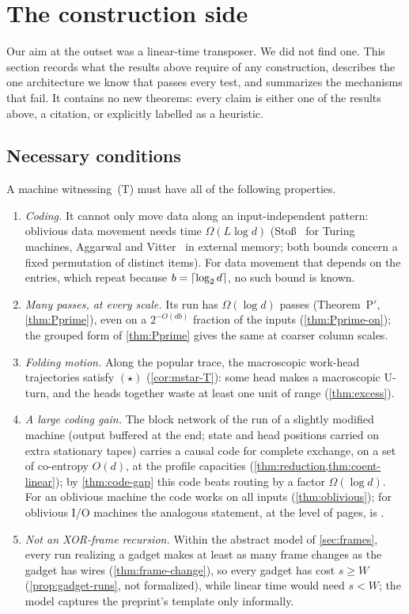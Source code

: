 \section{The construction side}\label{sec:construction}

Our aim at the outset was a linear-time transposer. We did not find one. This section records what the
results above require of any construction, describes the one architecture we know that passes every
test, and summarizes the mechanisms that fail. It contains no new theorems: every claim is either one of
the results above, a citation, or explicitly labelled as a heuristic.

\subsection{Necessary conditions}

A machine witnessing~(T) must have all of the following properties.
\begin{enumerate}[label=(N\arabic*),leftmargin=3em]
\item \emph{Coding.} It cannot only move data along an input-independent pattern: oblivious data movement needs
time $\Omega(L\log d)$ (Sto\ss~\cite{Stoss1973} for Turing machines, Aggarwal and Vitter~\cite{AggarwalVitter1988} in
external memory; both bounds concern a fixed permutation of distinct items). For data movement that depends on the
entries, which repeat because $b=\lceil \log_2 d \rceil$, no such bound is known.
\item \emph{Many passes, at every scale.} Its run has $\Omega(\log d)$ passes (Theorem~P$'$,
\cref{thm:Pprime}), even on a $2^{-O(db)}$ fraction of the inputs (\cref{thm:Pprime-on}); the grouped form of
\cref{thm:Pprime} gives the same at coarser column scales.
\item \emph{Folding motion.} Along the popular trace, the macroscopic work-head trajectories satisfy $(\star)$
(\cref{cor:mstar-T}): some head makes a macroscopic U-turn, and the heads together waste at least one unit of
range (\cref{thm:excess}).
\item \emph{A large coding gain.} The block network of the run of a slightly modified machine (output buffered at
the end; state and head positions carried on extra stationary tapes) carries a causal code for complete exchange,
on a set of co-entropy $O(d)$, at the profile capacities (\cref{thm:reduction,thm:coent-linear}); by
\cref{thm:code-gap} this code beats routing by a factor $\Omega(\log d)$. For an oblivious machine the code works
on all inputs (\cref{thm:oblivious}); for oblivious I/O machines the analogous statement, at the level of pages, is
\cite[Thm.~6.2]{AHJKL2006}.
\item \emph{Not an XOR-frame recursion.} Within the abstract model of \cref{sec:frames}, every run realizing a gadget makes at least as many frame changes as the gadget has wires (\cref{thm:frame-change}), so every gadget has cost $s\ge W$ (\cref{prop:gadget-runs}, not formalized), while linear time would need $s<W$; the
model captures the preprint's template only informally.
\end{enumerate}


